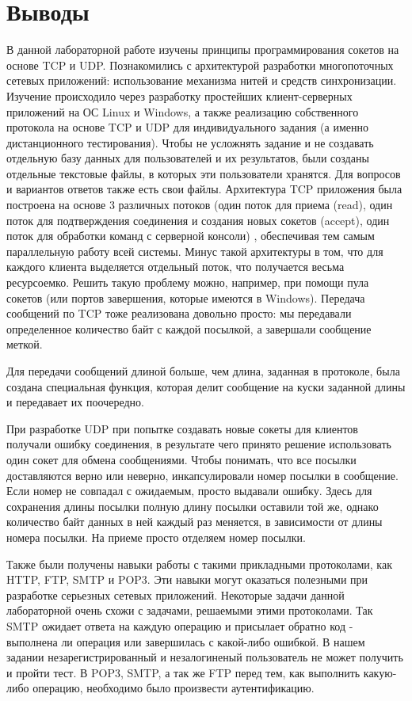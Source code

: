 \section{Выводы}
В данной лабораторной работе изучены принципы программирования сокетов на основе TCP и UDP. Познакомились с архитектурой разработки многопоточных сетевых приложений: использование механизма нитей и средств синхронизации. Изучение происходило через разработку простейших клиент-серверных приложений на ОС Linux и Windows, а также реализацию собственного протокола на основе TCP и UDP для индивидуального задания (а именно дистанционного тестирования). 
Чтобы не усложнять задание и не создавать отдельную базу данных для пользователей и их результатов, были созданы отдельные текстовые файлы, в которых эти пользователи хранятся. Для вопросов и вариантов ответов также есть свои файлы.
Архитектура TCP приложения была построена на основе 3 различных потоков (один поток для приема (read), один поток для подтверждения соединения и создания новых сокетов (accept), один поток для обработки команд с серверной консоли) , обеспечивая тем самым параллельную работу всей системы. Минус такой архитектуры в том, что для каждого клиента выделяется отдельный поток, что получается весьма ресурсоемко. Решить такую проблему можно, например, при помощи пула сокетов (или портов завершения, которые имеются в Windows).  
Передача сообщений по TCP тоже реализована довольно просто: мы передавали определенное количество байт с каждой посылкой, а завершали сообщение меткой.

Для передачи сообщений длиной больше, чем длина, заданная в протоколе, была создана специальная функция, которая делит сообщение на куски заданной длины и передавает их поочередно.

При разработке UDP при попытке создавать новые сокеты для клиентов получали ошибку соединения, в результате чего принято решение использовать один сокет для обмена сообщениями. Чтобы понимать, что все посылки доставляются верно или неверно, инкапсулировали номер посылки в сообщение. Если номер не совпадал с ожидаемым, просто выдавали ошибку. Здесь для сохранения длины посылки полную длину посылки оставили той же, однако количество байт данных в ней каждый раз меняется, в зависимости от длины номера посылки. На приеме просто отделяем номер посылки.

Также были получены навыки работы с такими прикладными протоколами, как HTTP, FTP, SMTP и POP3. Эти навыки могут оказаться полезными при разработке серьезных сетевых приложений.
Некоторые задачи данной лабораторной очень схожи с задачами, решаемыми этими протоколами. Так SMTP ожидает ответа на каждую операцию и присылает обратно код - выполнена ли операция или завершилась с какой-либо ошибкой. В нашем задании незарегистрированный и незалогиненый пользователь не может получить и пройти тест. В POP3, SMTP, а так же FTP перед тем, как выполнить какую-либо операцию, необходимо было произвести аутентификацию.

